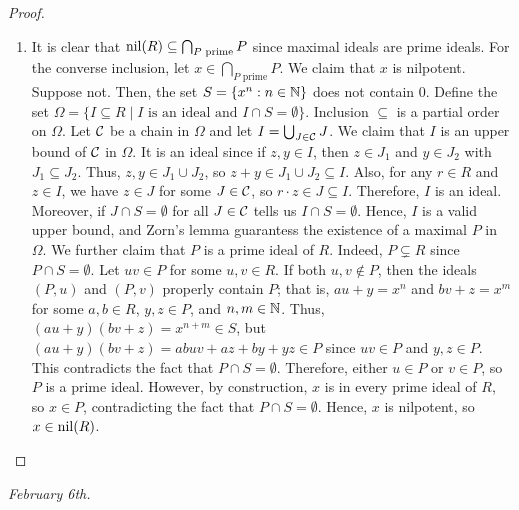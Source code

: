 \begin{proof}
\begin{enumerate}
        For the converse, suppose $1+ax$ is a unit for all $a \in R$. Let $\mf{m}$ be any maximal ideal of $R$. If $x \notin \mf{m}$, then the ideal $(\mf{m}, x)$ properly contains $\mf{m}$, so $(\mf{m}, x) = R$. Thus, there exist $m \in \mf{m}$ and $r \in R$ such that $1 = m + r \cdot x$. This implies that $1 - r \cdot x = m \in \mf{m}$, contradicting the fact that $1 - r \cdot x$ is a unit. Therefore, $x \in \mf{m}$. Since $\mf{m}$ was an arbitrary maximal ideal, we have $x \in \Jac(R)$.

        \item It is clear that $\operatorname{nil}(R) \subseteq \bigcap_{P \text{ prime}} P$ since maximal ideals are prime ideals. For the converse inclusion, let $x \in \bigcap_{P \text{ prime}} P$. We claim that $x$ is nilpotent. Suppose not. Then, the set $S = \{x^{n} : n \in \mathbb{N}\}$ does not contain $0$. Define the set $\Omega = \{I \subseteq R \mid I \text{ is an ideal and } I \cap S = \emptyset\}$. Inclusion $\subseteq$ is a partial order on $\Omega$. Let $\mathcal{C}$ be a chain in $\Omega$ and let $I = \bigcup_{J \in \mathcal{C}} J$. We claim that $I$ is an upper bound of $\mathcal{C}$ in $\Omega$. It is an ideal since if $z,y \in I$, then $z \in J_{1}$ and $y \in J_{2}$ with $J_{1} \subseteq J_{2}$. Thus, $z,y \in J_{1} \cup J_{2}$, so $z + y \in J_{1} \cup J_{2} \subseteq I$. Also, for any $r \in R$ and $z \in I$, we have $z \in J$ for some $J \in \mathcal{C}$, so $r \cdot z \in J \subseteq I$. Therefore, $I$ is an ideal. Moreover, if $J \cap S = \emptyset$ for all $J \in \mathcal{C}$ tells us $I \cap S = \emptyset$. Hence, $I$ is a valid upper bound, and Zorn's lemma guarantess the existence of a maximal $P$ in $\Omega$. We further claim that $P$ is a prime ideal of $R$. Indeed, $P \subsetneq R$ since $P \cap S = \emptyset$. Let $uv \in P$ for some $u,v \in R$. If both $u,v \notin P$, then the ideals $(P,u)$ and $(P,v)$ properly contain $P$; that is, $au + y = x^{n}$ and $bv + z = x^{m}$ for some $a,b \in R$, $y,z \in P$, and $n,m \in \mathbb{N}$. Thus, $(au+y)(bv+z) = x^{n+m} \in S$, but $(au+y)(bv+z) = abuv + az + by + yz \in P$ since $uv \in P$ and $y,z \in P$. This contradicts the fact that $P \cap S = \emptyset$. Therefore, either $u \in P$ or $v \in P$, so $P$ is a prime ideal. However, by construction, $x$ is in every prime ideal of $R$, so $x \in P$, contradicting the fact that $P \cap S = \emptyset$. Hence, $x$ is nilpotent, so $x \in \operatorname{nil}(R)$.
    \end{enumerate}
\end{proof}

\noindent \textit{February 6th.}

